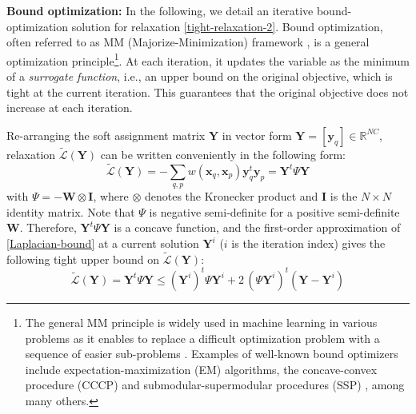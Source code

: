 \documentclass{article}
\newcommand{\yy}{{\mathbf y}}
\newcommand{\Lcal}{\mathcal{L}}
\newcommand{\xxq}{\mathbf{x}}
\newcommand{\YY}{\mathbf Y}
\newcommand{\WW}{\mathbf W}
\newcommand{\II}{{\mathbf I}}
\begin{document}
{\bf Bound optimization:} In the following, we detail an iterative bound-optimization solution for relaxation \eqref{tight-relaxation-2}. Bound optimization, often referred to as MM (Majorize-Minimization) framework \cite{lange2000optimization, Zhang2007}, is a general optimization principle\footnote{The general MM principle is widely used in machine learning in various problems as it enables to replace a difficult optimization problem with a sequence of easier sub-problems \cite{Zhang2007}. Examples of well-known bound optimizers include expectation-maximization (EM) algorithms, the concave-convex procedure (CCCP) \cite{Yuille2001} and submodular-supermodular procedures (SSP) \cite{Narasimhan2005}, among many others.}. At each iteration, it updates the variable as the minimum of a {\em surrogate function}, i.e., an upper bound on the original objective, which is tight at the current iteration. This guarantees that the original objective does not increase at each iteration.

Re-arranging the soft assignment matrix $\YY$ in vector form $\YY=[\yy_q] \in \mathbb{R}^{NC}$, relaxation $\tilde{\Lcal}(\YY)$ can be written conveniently in the following form:
\begin{equation}
\label{Laplacian-bound}
\tilde{\Lcal}(\YY) = - \sum_{q,p} w (\xxq_q, \xxq_p) \yy_q^t \yy_p = \YY^t\Psi \YY 
\end{equation}
with $\Psi = - \WW \otimes \II$, where $\otimes$ denotes the Kronecker product and $\II$ is the $N \times N$ identity matrix. Note that $\Psi$ is negative semi-definite for a positive semi-definite $\WW$. Therefore, $\YY^t\Psi \YY$ is a concave function, and the first-order approximation of \eqref{Laplacian-bound} at a current solution $\YY^i$ ($i$ is the iteration index) gives the following tight upper bound on $\tilde{\Lcal}(\YY)$:
\begin{equation}
\label{laplacian-upper-bound}
\tilde{\Lcal}(\YY) = \YY^t\Psi \YY  \leq (\YY^i)^t \Psi \YY^i + 2 \, (\Psi \YY^i)^t (\YY - \YY^i) 
\end{equation}
\end{document}
